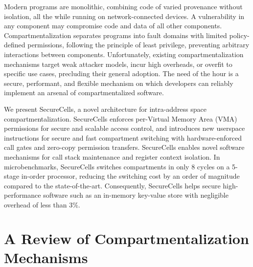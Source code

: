 \documentclass[lablogo]{thesis}
\begin{document}
Modern programs are monolithic, combining code of varied provenance without 
isolation, all the while running on network-connected devices. 
A vulnerability in any component may compromise code and data of all other 
components. 
Compartmentalization separates programs into fault domains with limited 
policy-defined permissions, following the principle of least privilege, 
preventing arbitrary interactions between components. 
Unfortunately, existing compartmentalization mechanisms target weak attacker 
models, incur high overheads, or overfit to specific use cases, precluding 
their general adoption. 
The need of the hour is a secure, performant, and flexible mechanism on which 
developers can reliably implement an arsenal of compartmentalized software. 

We present SecureCells, a novel architecture for intra-address space 
compartmentalization. 
SecureCells enforces per-Virtual Memory Area (VMA) permissions for secure and
scalable access control, and introduces new userspace instructions for 
secure and fast compartment switching with hardware-enforced call gates and 
zero-copy permission transfers. 
SecureCells enables novel software mechanisms for call stack maintenance and 
register context isolation. 
In microbenchmarks, SecureCells switches compartments in only 8 cycles on a 
5-stage in-order processor, reducing the switching cost by an order of magnitude
compared to the state-of-the-art. 
Consequently, SecureCells helps secure high-performance software such as an 
in-memory key-value store with negligible overhead of less than $3\%$.


\chapter{A Review of Compartmentalization Mechanisms }
\label{ch:compreview}



% 
\end{document}

